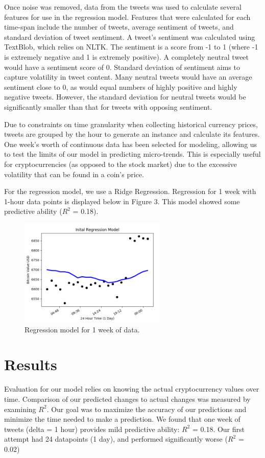 \documentclass[sigconf]{acmart}
\begin{document}
Once noise was removed, data from the tweets was used to calculate several features for use in the regression model. Features that were calculated for each time-span include the number of tweets, average sentiment of tweets, and standard deviation of tweet sentiment. A tweet's sentiment was calculated using TextBlob, which relies on NLTK. The sentiment is a score from -1 to 1 (where -1 is extremely negative and 1 is extremely positive). A completely neutral tweet would have a sentiment score of 0. Standard deviation of sentiment aims to capture volatility in tweet content. Many neutral tweets would have an average sentiment close to 0, as would equal numbers of highly positive and highly negative tweets. However, the standard deviation for neutral tweets would be significantly smaller than that for tweets with opposing sentiment. 

Due to constraints on time granularity when collecting historical currency prices, tweets are grouped by the hour to generate an instance and calculate its features. One week's worth of continuous data has been selected for modeling, allowing us to test the limits of our model in predicting micro-trends. This is especially useful for cryptocurrencies (as opposed to the stock market) due to the excessive volatility that can be found in a coin's price.

For the regression model, we use a Ridge Regression. Regression for 1 week with 1-hour data points is displayed below in Figure 3. This model showed some predictive ability ($R^2$ = 0.18).

\begin{figure}[H]
\caption{Regression model for 1 week of data.}
\includegraphics[width=7cm]{regression.png}
\end{figure}

\section{Results}
Evaluation for our model relies on knowing the actual cryptocurrency values over time. Comparison of our predicted changes to actual changes was measured by examining $R^2$. Our goal was to maximize the accuracy of our predictions and minimize the time needed to make a prediction. We found that one week of tweets (delta = 1 hour) provides mild predictive ability: $R^2$ = 0.18. Our first attempt had 24 datapoints (1 day), and performed significantly worse ($R^2$ = 0.02)
\end{document}

